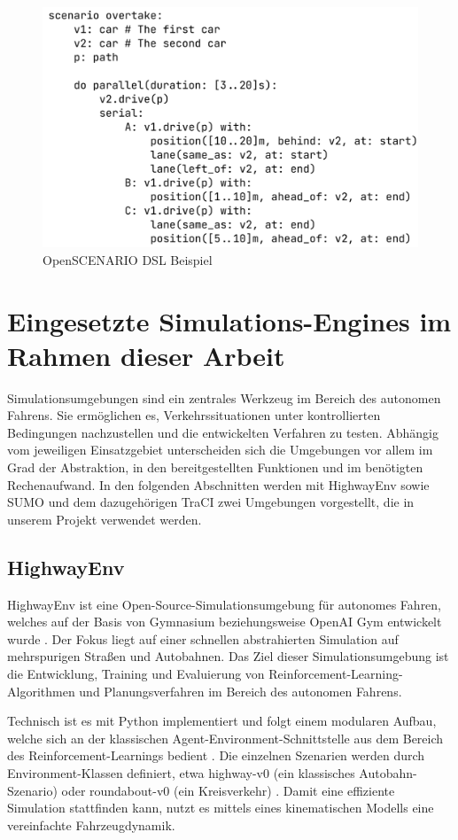 \begin{figure}[h]
    \centering
    \includegraphics[width=0.6\linewidth]{contents/figures/openscenario_dsl.png}
    \caption{OpenSCENARIO DSL Beispiel \cite{EinfuehrungIntegrationsprojekt}}
    \label{fig:osl-dsl}
\end{figure}

\section{Eingesetzte Simulations-Engines im Rahmen dieser Arbeit}
Simulationsumgebungen sind ein zentrales Werkzeug im Bereich des autonomen Fahrens. Sie ermöglichen es, Verkehrssituationen unter kontrollierten Bedingungen nachzustellen und die entwickelten Verfahren zu testen. Abhängig vom jeweiligen Einsatzgebiet unterscheiden sich die Umgebungen vor allem im Grad der Abstraktion, in den bereitgestellten Funktionen und im benötigten Rechenaufwand. In den folgenden Abschnitten werden mit HighwayEnv sowie SUMO und dem dazugehörigen TraCI zwei Umgebungen vorgestellt, die in unserem Projekt verwendet werden.
\subsection{HighwayEnv}
HighwayEnv ist eine Open-Source-Simulationsumgebung für autonomes Fahren, welches auf der Basis von Gymnasium beziehungsweise OpenAI Gym entwickelt wurde \cite{highway-env}. Der Fokus liegt auf einer schnellen abstrahierten Simulation auf mehrspurigen Straßen und Autobahnen. Das Ziel dieser Simulationsumgebung ist die Entwicklung, Training und Evaluierung von Reinforcement-Learning-Algorithmen und Planungsverfahren im Bereich des autonomen Fahrens.

Technisch ist es mit Python implementiert und folgt einem modularen Aufbau, welche sich an der klassischen Agent-Environment-Schnittstelle aus dem Bereich des Reinforcement-Learnings bedient \cite{highway-env}. Die einzelnen Szenarien werden durch Environment-Klassen definiert, etwa highway-v0 (ein klassisches Autobahn-Szenario) oder roundabout-v0 (ein Kreisverkehr) \cite{highway-env}. Damit eine effiziente Simulation stattfinden kann, nutzt es mittels eines kinematischen Modells eine vereinfachte Fahrzeugdynamik.

